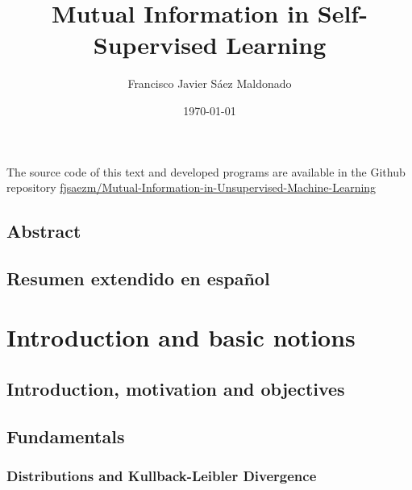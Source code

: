 \documentclass[oneside,openright,titlepage,numbers=noenddot,openany,headinclude,footinclude=true, cleardoublepage=empty,abstractoff,BCOR=5mm,paper=a4,fontsize=11pt, dvipsnames]{scrreprt}
\author{Francisco Javier Sáez Maldonado}
\date{\today}
\title{Mutual Information in Self-Supervised Learning}
\begin{document}
\maketitle


\vspace*{\fill}
\doclicenseThis
The source code of this text and developed programs are available in the Github repository \href{https://github.com/fjsaezm/Mutual-Information-in-Unsupervised-Machine-Learning}{fjsaezm/Mutual-Information-in-Unsupervised-Machine-Learning}

\chapter*{Abstract}

\chapter*{Resumen extendido en español}

\newpage


\tableofcontents
\newpage
\listoffigures
\listoftables

\newpage

\part{Introduction and basic notions}
\chapter{Introduction, motivation and objectives}

\clearpage
\chapter{Fundamentals}

\section{Distributions and Kullback-Leibler Divergence}

\clearpage
\end{document}
